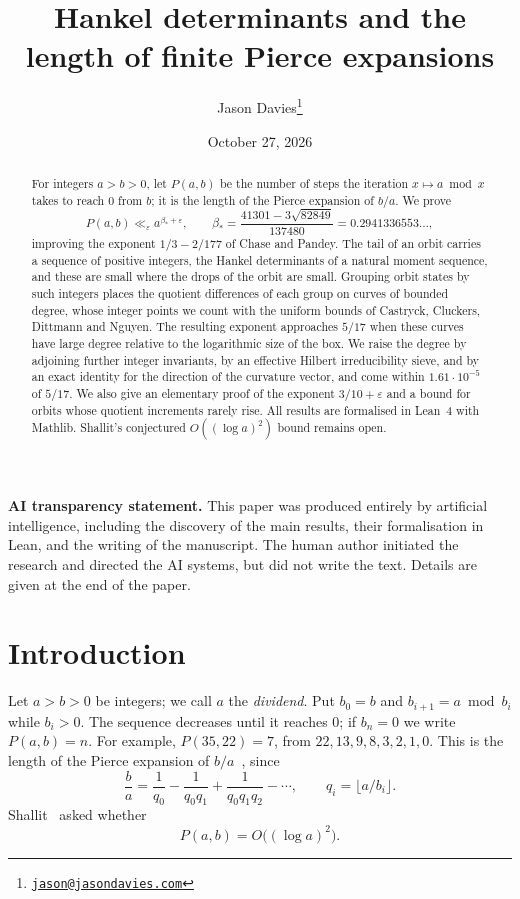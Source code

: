 \documentclass[11pt]{article}
\title{Hankel determinants and the length of finite Pierce expansions}
\author{Jason Davies\thanks{\href{mailto:jason@jasondavies.com}{\nolinkurl{jason@jasondavies.com}}}}
\date{October 27, 2026}
\theoremstyle{definition}
\theoremstyle{remark}
\begin{document}
\maketitle
\begin{abstract}
For integers $a>b>0$, let $P(a,b)$ be the number of steps the iteration
$x\mapsto a\bmod x$ takes to reach $0$ from $b$; it is the length of the
Pierce expansion of $b/a$. We prove
\[
 P(a,b)\ll_\varepsilon a^{\beta_*+\varepsilon},\qquad
 \beta_*=\frac{41301-3\sqrt{82849}}{137480}=0.2941336553\ldots,
\]
improving the exponent $1/3-2/177$ of Chase and Pandey. The tail of an orbit
carries a sequence of positive integers, the Hankel determinants of a natural
moment sequence, and these are small where the drops of the orbit are small.
Grouping orbit states by such integers places the quotient differences of each group on
curves of bounded degree, whose integer points we count with the uniform
bounds of Castryck, Cluckers, Dittmann and Nguyen. The resulting exponent
approaches $5/17$ when these curves have large degree relative to the
logarithmic size of the box. We raise the degree by
adjoining further integer invariants, by an effective Hilbert irreducibility
sieve, and by an exact identity for the direction of the curvature vector,
and come within $1.61\cdot10^{-5}$ of $5/17$. We also give an
elementary proof of the exponent $3/10+\varepsilon$ and a bound for orbits
whose quotient increments rarely rise. All results are formalised in Lean~4
with Mathlib. Shallit's conjectured $O((\log a)^2)$ bound remains open.
\end{abstract}

\noindent\textbf{AI transparency statement.} This paper was produced entirely
by artificial intelligence, including the discovery of the main results, their
formalisation in Lean, and the writing of the manuscript. The human author
initiated the research and directed the AI systems, but did not write the text.
Details are given at the end of the paper.

\section{Introduction}\label{sec:intro}

Let $a>b>0$ be integers; we call $a$ the \emph{dividend}. Put $b_0=b$ and
$b_{i+1}=a\bmod b_i$ while $b_i>0$.
The sequence decreases until it reaches $0$; if $b_n=0$ we write $P(a,b)=n$.
For example, $P(35,22)=7$, from $22,13,9,8,3,2,1,0$. This is the length of
the Pierce expansion of $b/a$~\cite{Pierce,Shallit86}, since
\[
 \frac ba=\frac1{q_0}-\frac1{q_0q_1}+\frac1{q_0q_1q_2}-\cdots,
 \qquad q_i=\lfloor a/b_i\rfloor.
\]
Shallit~\cite{OPG} asked whether
\begin{equation}\label{eq:conj}
 P(a,b)=O\bigl((\log a)^2\bigr).
\end{equation}
\end{document}
